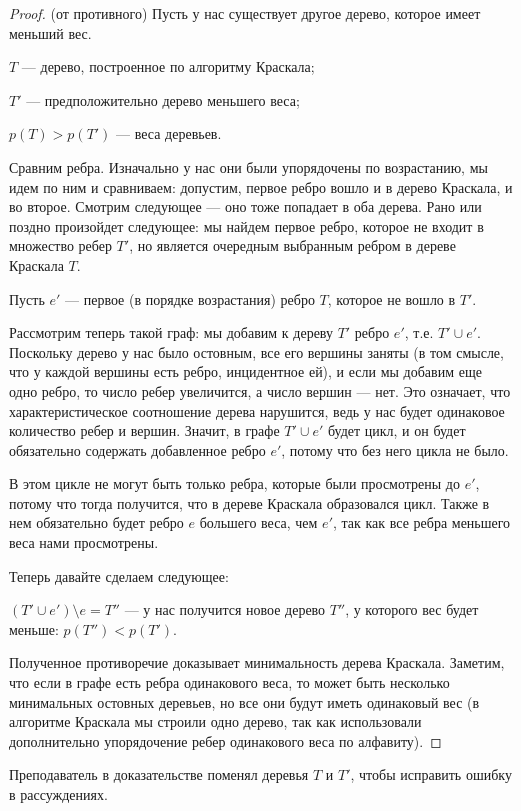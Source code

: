 \documentclass[russian]{lecture-notes}
\begin{document}
	\begin{proof} (от противного)
		Пусть у нас существует другое дерево, которое имеет меньший вес.
		
		$T$ --- дерево, построенное по алгоритму Краскала;
		
		$T'$ --- предположительно дерево меньшего веса;
		
		$p(T) > p(T')$ --- веса деревьев.
		
		Сравним ребра. Изначально у нас они были упорядочены по возрастанию, мы идем по ним и сравниваем: допустим, первое ребро вошло и в дерево Краскала, и во второе. Смотрим следующее --- оно тоже попадает в оба дерева. Рано или поздно произойдет следующее: мы найдем первое ребро, которое не входит в множество ребер $T'$, но является очередным выбранным ребром в дереве Краскала $T$.
		
		Пусть $e'$ --- первое (в порядке возрастания) ребро $T$, которое не вошло в $T'$. 
		
		Рассмотрим теперь такой граф: мы добавим к  дереву $T'$ ребро $e'$, т.е. $T' \cup e'$. Поскольку дерево у нас было остовным, все его вершины заняты (в том смысле, что у каждой вершины есть ребро, инцидентное ей), и если мы добавим еще одно ребро, то число ребер увеличится, а число вершин --- нет. Это означает, что характеристическое соотношение дерева нарушится, ведь у нас будет одинаковое количество ребер и вершин. Значит, в графе $T' \cup e'$ будет цикл, и он будет обязательно содержать добавленное ребро $e'$, потому что без него цикла не было.
		
		В этом цикле не могут быть только ребра, которые были просмотрены до $e'$, потому что тогда получится, что в дереве Краскала образовался цикл. Также в нем обязательно будет ребро $e$ большего веса, чем $e'$, так как все ребра меньшего веса нами просмотрены.
		
		Теперь давайте сделаем следующее: 
		
		$(T' \cup e') \setminus e = T''$
		--- у нас получится новое дерево $T''$, у которого вес будет меньше: $p(T'') < p(T')$. 
		
		Полученное противоречие доказывает минимальность дерева Краскала. Заметим, что если в графе есть ребра одинакового веса, то может быть несколько минимальных остовных деревьев, но все они будут иметь одинаковый вес (в алгоритме Краскала мы строили одно дерево, так как использовали дополнительно упорядочение ребер одинакового веса по алфавиту).
	\end{proof}
	\begin{remark} [от редактора]
		Преподаватель в доказательстве поменял деревья $T$ и $T'$, чтобы исправить ошибку в рассуждениях.
		
	\end{remark}
	
\end{document}
